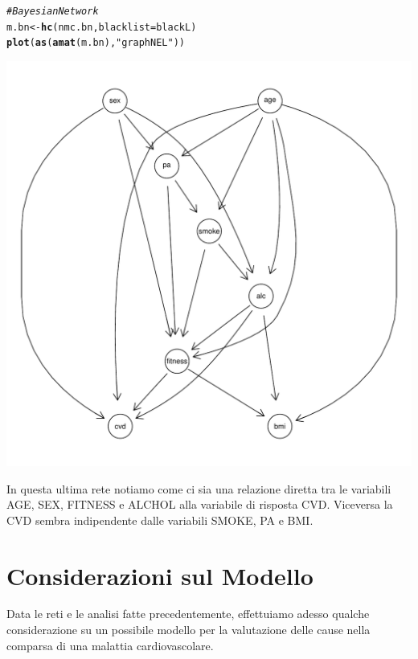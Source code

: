 \documentclass{article}\usepackage[]{graphicx}\usepackage[]{xcolor}
\makeatletter
\def\maxwidth{ %
  \ifdim\Gin@nat@width>\linewidth
    \linewidth
  \else
    \Gin@nat@width
  \fi
}
\newcommand{\hlstr}[1]{\textcolor[rgb]{0.192,0.494,0.8}{#1}}%
\newcommand{\hlcom}[1]{\textcolor[rgb]{0.678,0.584,0.686}{\textit{#1}}}%
\newcommand{\hlstd}[1]{\textcolor[rgb]{0.345,0.345,0.345}{#1}}%
\newcommand{\hlkwb}[1]{\textcolor[rgb]{0.69,0.353,0.396}{#1}}%
\newcommand{\hlkwc}[1]{\textcolor[rgb]{0.333,0.667,0.333}{#1}}%
\newcommand{\hlkwd}[1]{\textcolor[rgb]{0.737,0.353,0.396}{\textbf{#1}}}%
\newenvironment{kframe}{%
 \def\at@end@of@kframe{}%
 \ifinner\ifhmode%
  \def\at@end@of@kframe{\end{minipage}}%
  \begin{minipage}{\columnwidth}%
 \fi\fi%
 \def\FrameCommand##1{\hskip\@totalleftmargin \hskip-\fboxsep
 \colorbox{shadecolor}{##1}\hskip-\fboxsep
     \hskip-\linewidth \hskip-\@totalleftmargin \hskip\columnwidth}%
 \MakeFramed {\advance\hsize-\width
   \@totalleftmargin\z@ \linewidth\hsize
   \@setminipage}}%
 {\par\unskip\endMakeFramed%
 \at@end@of@kframe}
\newenvironment{knitrout}{}{} %
\makeatother
\begin{document}
\begin{knitrout}
\color{fgcolor}\begin{kframe}
\begin{alltt}
\hlcom{#Bayesian Network}
\hlstd{m.bn} \hlkwb{<-} \hlkwd{hc}\hlstd{(nmc.bn,} \hlkwc{blacklist}\hlstd{=blackL)}
\hlkwd{plot}\hlstd{(}\hlkwd{as}\hlstd{(}\hlkwd{amat}\hlstd{(m.bn),} \hlstr{"graphNEL"}\hlstd{))}
\end{alltt}
\end{kframe}
\includegraphics[width=\maxwidth]{figure/Bayesian_Network_finale-1} 
\end{knitrout}
    
    In questa ultima rete notiamo come ci sia una relazione diretta
    tra le variabili AGE, SEX, FITNESS e ALCHOL alla variabile di risposta CVD. 
    Viceversa la CVD sembra indipendente dalle variabili SMOKE, PA e BMI.
    
  \clearpage


\section{Considerazioni sul Modello}
  Data le reti e le analisi fatte precedentemente, effettuiamo adesso qualche
  considerazione su un possibile modello per la valutazione delle cause nella
  comparsa di una malattia cardiovascolare.
  
\end{document}
